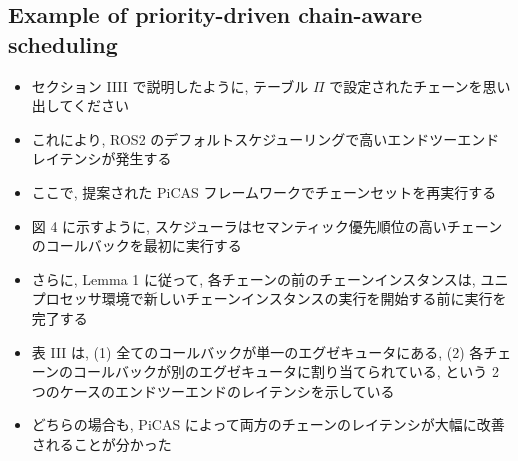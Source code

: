 \subsection{Example of priority-driven chain-aware scheduling}
\label{ssec: example of priority-driven chain-aware scheduling}

\begin{frame}{}
    \begin{itemize}
        \item セクション IIII で説明したように, テーブル $\Pi$ で設定されたチェーンを思い出してください
        \item これにより, ROS2 のデフォルトスケジューリングで高いエンドツーエンドレイテンシが発生する
        \item ここで, 提案された PiCAS フレームワークでチェーンセットを再実行する
        \item 図 4 に示すように, スケジューラはセマンティック優先順位の高いチェーンのコールバックを最初に実行する
        \item さらに, Lemma 1 に従って, 各チェーンの前のチェーンインスタンスは, ユニプロセッサ環境で新しいチェーンインスタンスの実行を開始する前に実行を完了する
        \item 表 III は, (1) 全てのコールバックが単一のエグゼキュータにある, (2) 各チェーンのコールバックが別のエグゼキュータに割り当てられている, という 2 つのケースのエンドツーエンドのレイテンシを示している
        \item どちらの場合も, PiCAS によって両方のチェーンのレイテンシが大幅に改善されることが分かった
    \end{itemize}
\end{frame}

